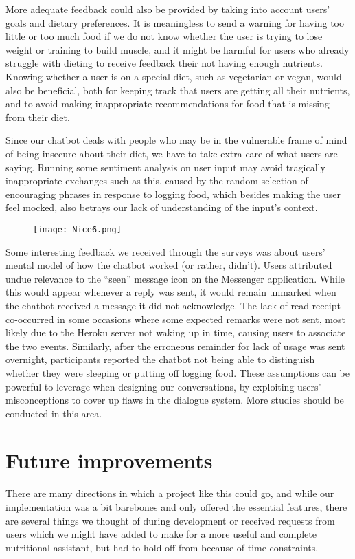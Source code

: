 More adequate feedback could also be provided by taking into account users' goals and dietary preferences. It is meaningless to send a warning for having too little or too much food if we do not know whether the user is trying to lose weight or training to build muscle, and it might be harmful for users who already struggle with dieting to receive feedback their not having enough nutrients. Knowing whether a user is on a special diet, such as vegetarian or vegan, would also be beneficial, both for keeping track that users are getting all their nutrients, and to avoid making inappropriate recommendations for food that is missing from their diet. 

Since our chatbot deals with people who may be in the vulnerable frame of mind of being insecure about their diet, we have to take extra care of what users are saying. Running some sentiment analysis on user input may avoid tragically inappropriate exchanges such as this, caused by the random selection of encouraging phrases in response to logging food, which besides making the user feel mocked, also betrays our lack of understanding of the input's context. \\

\begin{figure}[h!]
  \texttt{[image: Nice6.png]}
\end{figure}

Some interesting feedback we received through the surveys was about users' mental model of how the chatbot worked (or rather, didn't). Users attributed undue relevance to the ``seen'' message icon on the Messenger application. While this would appear whenever a reply was sent, it would remain unmarked when the chatbot received a message it did not acknowledge. The lack of read receipt co-occurred in some occasions where some expected remarks were not sent, most likely due to the Heroku server not waking up in time, causing users to associate the two events. Similarly, after the erroneous reminder for lack of usage was sent overnight, participants reported the chatbot not being able to distinguish whether they were sleeping or putting off logging food. These assumptions can be powerful to leverage when designing our conversations, by exploiting users' misconceptions to cover up flaws in the dialogue system. More studies should be conducted in this area. 

\section{Future improvements} 
There are many directions in which a project like this could go, and while our implementation was a bit barebones and only offered the essential features, there are several things we thought of during development or received requests from users which we might have added to make for a more useful and complete nutritional assistant, but had to hold off from because of time constraints. 

